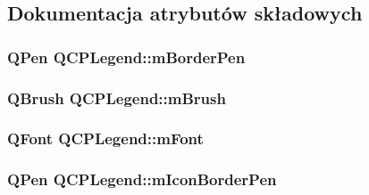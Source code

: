 \subsection{Dokumentacja atrybutów składowych}
\subsubsection[{\texorpdfstring{m\+Border\+Pen}{mBorderPen}}]{\setlength{\rightskip}{0pt plus 5cm}Q\+Pen Q\+C\+P\+Legend\+::m\+Border\+Pen\hspace{0.3cm}{\ttfamily [protected]}}\hypertarget{class_q_c_p_legend_a52ab8342a382456131d567f962d7f9d0}{}\label{class_q_c_p_legend_a52ab8342a382456131d567f962d7f9d0}
\subsubsection[{\texorpdfstring{m\+Brush}{mBrush}}]{\setlength{\rightskip}{0pt plus 5cm}Q\+Brush Q\+C\+P\+Legend\+::m\+Brush\hspace{0.3cm}{\ttfamily [protected]}}\hypertarget{class_q_c_p_legend_a9bd7cd05a9a485e06eda513a348baf80}{}\label{class_q_c_p_legend_a9bd7cd05a9a485e06eda513a348baf80}
\subsubsection[{\texorpdfstring{m\+Font}{mFont}}]{\setlength{\rightskip}{0pt plus 5cm}Q\+Font Q\+C\+P\+Legend\+::m\+Font\hspace{0.3cm}{\ttfamily [protected]}}\hypertarget{class_q_c_p_legend_a56ffacb184a99eefe09a0c7181d0713d}{}\label{class_q_c_p_legend_a56ffacb184a99eefe09a0c7181d0713d}
\subsubsection[{\texorpdfstring{m\+Icon\+Border\+Pen}{mIconBorderPen}}]{\setlength{\rightskip}{0pt plus 5cm}Q\+Pen Q\+C\+P\+Legend\+::m\+Icon\+Border\+Pen\hspace{0.3cm}{\ttfamily [protected]}}\hypertarget{class_q_c_p_legend_a773ae518c3149fcabff4a2906fdacbc4}{}\label{class_q_c_p_legend_a773ae518c3149fcabff4a2906fdacbc4}
